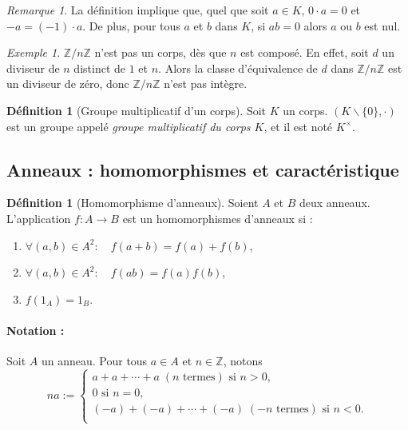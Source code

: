 \documentclass[a4paper, titlepage]{article}
\theoremstyle{definition}
\newtheorem{defi}[theo]{Définition}
\theoremstyle{remark}
\newtheorem{rema}[theo]{Remarque}
\newtheorem{exem}[theo]{Exemple}
\def\Z{\mathbb Z}
\begin{document}
\begin{rema}
La définition implique que, quel que soit $a \in K$, $0\cdot a = 0$ et $-a = (-1)\cdot a$. De plus, pour tous $a$ et $b$ dans $K$, si $ab = 0$ alors $a$ ou $b$ est nul.
\end{rema}

\begin{exem}
$\Z/n\Z$ n'est pas un corps, dès que $n$ est composé. En effet, soit $d$ un diviseur de $n$ distinct de $1$ et $n$. Alors la classe d'équivalence de $d$ dans $\Z/n\Z$ est un diviseur de zéro, donc $\Z/n\Z$ n'est pas intègre.
\end{exem}

\begin{defi}[Groupe multiplicatif d'un corps]
Soit $K$ un corps. $(K\backslash\{0\},\cdot)$ est un groupe appelé \textit{groupe multiplicatif du corps $K$}, et il est noté $K^\times$.
\end{defi}

\subsection{Anneaux : homomorphismes et caractéristique}

\begin{defi}[Homomorphisme d'anneaux]\label{defMorphismeAnneaux}
Soient $A$ et $B$ deux anneaux. L'application $f: A \rightarrow B$ est un homomorphismes d'anneaux si : \begin{enumerate}
\item $\forall (a,b) \in A^2: \quad f(a+b) = f(a) + f(b)$,
\item $\forall (a,b) \in A^2: \quad f(ab) = f(a)f(b)$,
\item $f(1_A) = 1_B$.
\end{enumerate}
\end{defi}

\paragraph*{Notation :}
Soit $A$ un anneau. Pour tous $a \in A$ et $n \in \Z$, notons
$$na := \left\{\begin{array}{l}
a + a + \cdots + a \; (n \text{ termes}) \text{ si } n > 0,\\
0 \text{ si } n = 0,\\
(-a) + (-a) + \cdots + (-a)\; (-n \text{ termes}) \text{ si } n < 0.\\
\end{array}\right.$$
\end{document}
